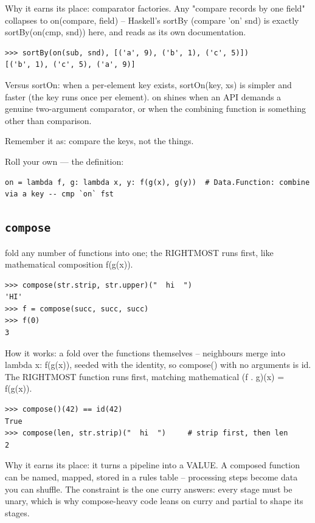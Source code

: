 \documentclass[10pt,letterpaper]{book}
\begin{document}
Why it earns its place: comparator factories. Any "compare records by one field" collapses to on(compare, field) -- Haskell's sortBy (compare 'on' snd) is exactly sortBy(on(cmp, snd)) here, and reads as its own documentation.

\begin{lstlisting}[style=ex]
>>> sortBy(on(sub, snd), [('a', 9), ('b', 1), ('c', 5)])
[('b', 1), ('c', 5), ('a', 9)]
\end{lstlisting}

Versus sortOn: when a per-element key exists, sortOn(key, xs) is simpler and faster (the key runs once per element). on shines when an API demands a genuine two-argument comparator, or when the combining function is something other than comparison.


Remember it as: compare the keys, not the things.


Roll your own --- the definition:

\begin{lstlisting}[style=ex]
on = lambda f, g: lambda x, y: f(g(x), g(y))  # Data.Function: combine via a key -- cmp `on` fst
\end{lstlisting}
\subsection{\texttt{compose}}\label{def:compose}
fold any number of functions into one; the RIGHTMOST runs first, like mathematical composition f(g(x)).
\begin{lstlisting}[style=ex]
>>> compose(str.strip, str.upper)("  hi  ")
'HI'
>>> f = compose(succ, succ, succ)
>>> f(0)
3
\end{lstlisting}

How it works: a fold over the functions themselves -- neighbours merge into lambda x: f(g(x)), seeded with the identity, so compose() with no arguments is id. The RIGHTMOST function runs first, matching mathematical (f . g)(x) = f(g(x)).

\begin{lstlisting}[style=ex]
>>> compose()(42) == id(42)
True
>>> compose(len, str.strip)("  hi  ")     # strip first, then len
2
\end{lstlisting}

Why it earns its place: it turns a pipeline into a VALUE. A composed function can be named, mapped, stored in a rules table -- processing steps become data you can shuffle. The constraint is the one curry answers: every stage must be unary, which is why compose-heavy code leans on curry and partial to shape its stages.
\end{document}

